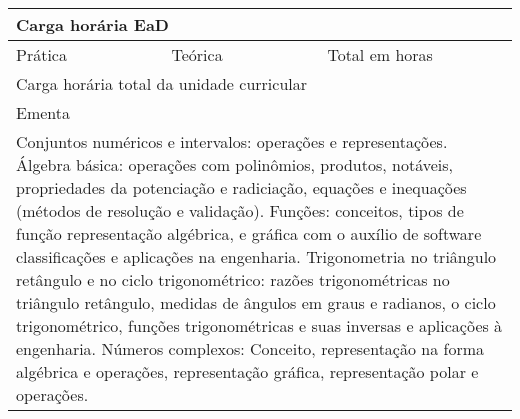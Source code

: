 \begin{quadro}[ht!]
\begin{tabular}{|p{3cm} p{2cm} p{3cm} p{2cm} p{3cm} p{2cm}|}
\multicolumn{6}{|p{15cm}|}{\cellcolor{blue1} Carga horária EaD} \\ \hline
\multicolumn{1}{|p{3cm}|}{\raggedleft Prática} & \multicolumn{1}{p{1cm}|}{\centering 0} &  \multicolumn{1}{p{3cm}|}{\raggedleft Teórica}  & \multicolumn{1}{p{1cm}|}{\centering 0} & \multicolumn{1}{p{3cm}|}{\raggedleft Total em horas} & \multicolumn{1}{p{1cm}|}{\raggedleft 0} \\ \hline
\multicolumn{5}{|p{13cm}|}{\cellcolor{blue1} Carga horária total da unidade curricular} & \multicolumn{1}{p{1cm}|}{\raggedleft 60	}\\\hline
\multicolumn{6}{|p{15cm}|}{\cellcolor{blue1} Ementa} \\\hline
\hline\multicolumn{6}{|p{15cm}|}{\scriptsize Conjuntos numéricos e intervalos: operações e representações. Álgebra básica: operações com polinômios, produtos, notáveis, propriedades da potenciação e radiciação, equações e inequações (métodos de resolução e validação). Funções: conceitos, tipos de função representação algébrica, e gráfica com o auxílio de software classificações e aplicações na engenharia. Trigonometria no triângulo retângulo e no ciclo trigonométrico: razões trigonométricas no triângulo retângulo, medidas de ângulos em graus e radianos, o ciclo trigonométrico, funções trigonométricas e suas inversas e aplicações à engenharia. Números complexos: Conceito, representação na forma algébrica e operações, representação gráfica, representação polar e operações.}\\\hline
\hline
	\end{tabular}
\end{quadro}
\clearpage

